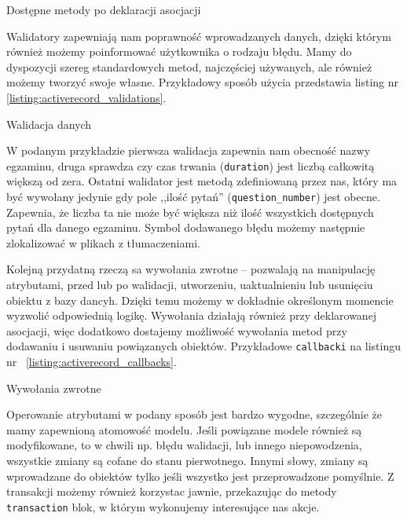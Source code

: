 \documentclass[a4paper,12pt]{article}
\begin{document}
\begin{listing}
  
  \caption{Dostępne metody po deklaracji asocjacji}
  \label{listing:activerecord_association_finders}
\end{listing}


Walidatory zapewniają nam poprawność wprowadzanych danych, dzięki którym również
możemy poinformować użytkownika o rodzaju błędu. Mamy do dyspozycji szereg
standardowych metod, najczęściej używanych, ale również możemy tworzyć swoje
własne. Przykładowy sposób użycia przedstawia listing nr \ref{listing:activerecord_validations}.

\begin{listing}
  
  \caption{Walidacja danych}
  \label{listing:activerecord_validations}
\end{listing}


W podanym przykładzie pierwsza walidacja zapewnia nam obecność nazwy egzaminu,
druga sprawdza czy czas trwania (\texttt{duration}) jest liczbą całkowitą większą od
zera. Ostatni walidator jest metodą zdefiniowaną przez nas, który ma być
wywołany jedynie gdy pole ,,ilość pytań'' (\texttt{question\_number}) jest obecne.
Zapewnia, że liczba ta nie może być większa niż ilość wszystkich dostępnych
pytań dla danego egzaminu. Symbol dodawanego błędu możemy następnie zlokalizować
w plikach z tłumaczeniami.


Kolejną przydatną rzeczą sa wywołania zwrotne -- pozwalają na manipulację
atrybutami, przed lub po walidacji, utworzeniu, uaktualnieniu lub usunięciu
obiektu z bazy dancyh. Dzięki temu możemy w dokładnie określonym momencie
wyzwolić odpowiednią logikę. Wywołania działają również przy deklarowanej
asocjacji, więc dodatkowo dostajemy możliwość wywołania metod przy dodawaniu i
usuwaniu powiązanych obiektów. Przykładowe \texttt{callbacki} na listingu nr~
\ref{listing:activerecord_callbacks}.

\begin{listing}
  
  \caption{Wywołania zwrotne}
  \label{listing:activerecord_callbacks}
\end{listing}


Operowanie atrybutami w podany sposób jest bardzo wygodne, szczególnie że mamy
zapewnioną atomowość modelu. Jeśli powiązane modele również są modyfikowane, to
w chwili np. błędu walidacji, lub innego niepowodzenia, wszystkie zmiany są
cofane do stanu pierwotnego. Innymi słowy, zmiany są wprowadzane do obiektów
tylko jeśli wszystko jest przeprowadzone pomyślnie. Z transakcji możemy również
korzystac jawnie, przekazując do metody \texttt{transaction} blok, w którym
wykonujemy interesujące nas akcje.
\end{document}

